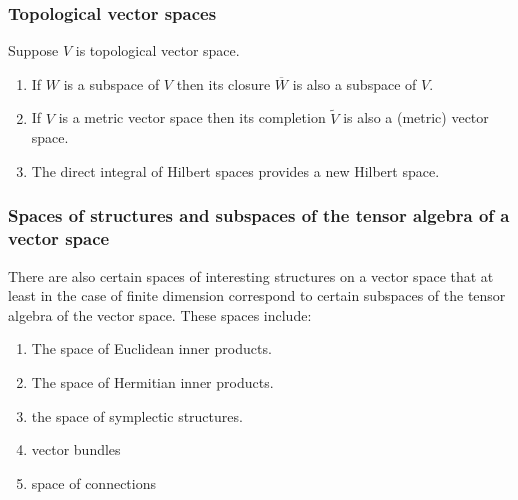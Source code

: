 \documentclass[12pt]{article}
\begin{document}
\subsubsection*{Topological vector spaces}

Suppose $V$ is topological vector space.
\begin{enumerate}
\item If $W$ is a subspace of $V$ then its closure $\overline{W}$ is also a subspace of $V$.
\item If $V$ is a metric vector space then its completion $\widetilde{V}$ is also a (metric) vector space.
\item The direct integral of Hilbert spaces provides a new Hilbert space.
\end{enumerate}

\subsubsection*{Spaces of structures and subspaces of the tensor algebra of a vector space}

There are also certain spaces of interesting structures on a vector
space that at least in the case of finite dimension correspond to
certain subspaces of the tensor algebra of the vector space.  These
spaces include:

\begin{enumerate}
\item The space of Euclidean inner products.
\item The space of Hermitian inner products.
\item the space of symplectic structures.
\item vector bundles
\item space of connections
\end{enumerate}
\end{document}
